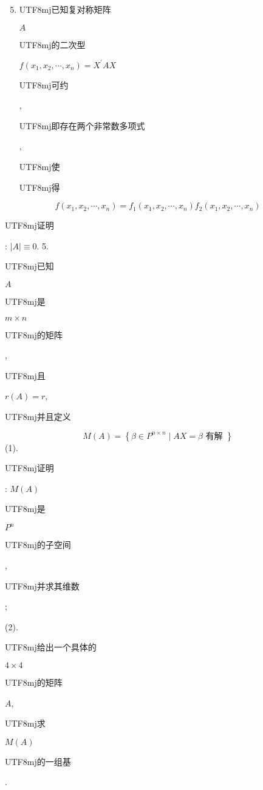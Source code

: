 \documentclass[10pt]{article}
\begin{document}
\begin{enumerate}
  \setcounter{enumi}{4}
  \item \begin{CJK}{UTF8}{mj}已知复对称矩阵\end{CJK} $A$ \begin{CJK}{UTF8}{mj}的二次型\end{CJK} $f\left(x_{1}, x_{2}, \cdots, x_{n}\right)=X^{\prime} A X$ \begin{CJK}{UTF8}{mj}可约\end{CJK}, \begin{CJK}{UTF8}{mj}即存在两个非常数多项式\end{CJK}, \begin{CJK}{UTF8}{mj}使\end{CJK} \begin{CJK}{UTF8}{mj}得\end{CJK}
\end{enumerate}
$$
f\left(x_{1}, x_{2}, \cdots, x_{n}\right)=f_{1}\left(x_{1}, x_{2}, \cdots, x_{n}\right) f_{2}\left(x_{1}, x_{2}, \cdots, x_{n}\right)
$$
\begin{CJK}{UTF8}{mj}证明\end{CJK}: $|A| \equiv 0$. 5. \begin{CJK}{UTF8}{mj}已知\end{CJK} $A$ \begin{CJK}{UTF8}{mj}是\end{CJK} $m \times n$ \begin{CJK}{UTF8}{mj}的矩阵\end{CJK}, \begin{CJK}{UTF8}{mj}且\end{CJK} $r(A)=r$, \begin{CJK}{UTF8}{mj}并且定义\end{CJK}
$$
M(A)=\left\{\beta \in P^{n \times n} \mid A X=\beta \text { 有解 }\right\}
$$
(1). \begin{CJK}{UTF8}{mj}证明\end{CJK}: $M(A)$ \begin{CJK}{UTF8}{mj}是\end{CJK} $P^{n}$ \begin{CJK}{UTF8}{mj}的子空间\end{CJK}, \begin{CJK}{UTF8}{mj}并求其维数\end{CJK};

(2). \begin{CJK}{UTF8}{mj}给出一个具体的\end{CJK} $4 \times 4$ \begin{CJK}{UTF8}{mj}的矩阵\end{CJK} $A$, \begin{CJK}{UTF8}{mj}求\end{CJK} $M(A)$ \begin{CJK}{UTF8}{mj}的一组基\end{CJK}.
\end{document}
